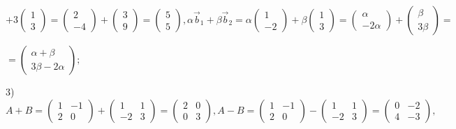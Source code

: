 \documentclass[12pt,a4paper]{article}
\begin{document}
    \(
    +3\begin{pmatrix}
    1 \\
    3 
    \end{pmatrix}
    =
    \begin{pmatrix}
    2 \\
    -4 
    \end{pmatrix} +
    \begin{pmatrix}
    3 \\
    9 
    \end{pmatrix} = \begin{pmatrix}
    5 \\
    5 
    \end{pmatrix}
    ,
    \alpha \vec{b}_1 + \beta \vec{b}_2 = 
    \alpha \begin{pmatrix}
    1 \\
    -2 
    \end{pmatrix} + \beta \begin{pmatrix}
    1 \\
    3 
    \end{pmatrix} = \begin{pmatrix}
    \alpha \\
    -2 \alpha
    \end{pmatrix} + \begin{pmatrix}
    \beta \\
    3\beta 
    \end{pmatrix}
    =\)

    \(
    = \begin{pmatrix}
    \alpha+\beta \\
    3\beta - 2\alpha
    \end{pmatrix};
    \)

    3) \(A + B = 
    \begin{pmatrix}
    1 & -1\\
    2 & 0 
    \end{pmatrix} + 
    \begin{pmatrix}
    1 & 1\\
    -2 & 3 
    \end{pmatrix} = 
    \begin{pmatrix}
    2 & 0\\
    0 & 3 
    \end{pmatrix}
    ,
    A - B = 
    \begin{pmatrix}
    1 & -1\\
    2 & 0 
    \end{pmatrix} - 
    \begin{pmatrix}
    1 & 1\\
    -2 & 3 
    \end{pmatrix} = 
    \begin{pmatrix}
    0 & -2\\
    4 & -3 
    \end{pmatrix},
    \)
\end{document}

